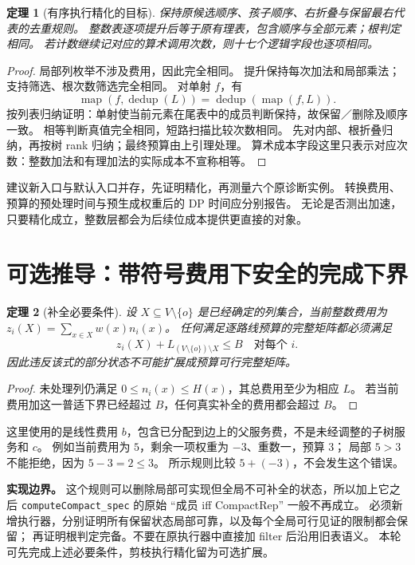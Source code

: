 \documentclass[UTF8,a4paper,11pt]{ctexart}
\newtheorem{theorem}{定理}[section]
\theoremstyle{definition}
\begin{document}
\begin{theorem}[有序执行精化的目标]
保持原候选顺序、孩子顺序、右折叠与保留最右代表的去重规则。
整数表逐项提升后等于原有理表，包含顺序与全部元素；根判定相同。
若计数继续记对应的算术调用次数，则十七个逻辑字段也逐项相同。
\end{theorem}
\begin{proof}
局部列枚举不涉及费用，因此完全相同。
提升保持每次加法和局部乘法；支持筛选、根次数筛选完全相同。
对单射 $f$，有
\[
 \operatorname{map}(f,\operatorname{dedup}(L))
 =\operatorname{dedup}(\operatorname{map}(f,L)).
\]
按列表归纳证明：单射使当前元素在尾表中的成员判断保持，故保留／删除及顺序一致。
相等判断真值完全相同，短路扫描比较次数相同。
先对内部、根折叠归纳，再按树 rank 归纳；最终预算由上引理处理。
算术成本字段这里只表示对应次数：整数加法和有理加法的实际成本不宣称相等。
\end{proof}

建议新入口与默认入口并存，先证明精化，再测量六个原诊断实例。
转换费用、预算的预处理时间与预生成权重后的 DP 时间应分别报告。
无论是否测出加速，只要精化成立，整数层都会为后续位成本提供更直接的对象。

\section{可选推导：带符号费用下安全的完成下界}

\begin{theorem}[补全必要条件]
设 $X\subseteq V\setminus\{o\}$ 是已经确定的列集合，当前整数费用为
$z_i(X)=\sum_{x\in X}w(x)n_i(x)$。
任何满足逐路线预算的完整矩阵都必须满足
\[
 z_i(X)+L_{(V\setminus\{o\})\setminus X}\le B\quad\text{对每个 }i.
\]
因此违反该式的部分状态不可能扩展成预算可行完整矩阵。
\end{theorem}
\begin{proof}
未处理列仍满足 $0\le n_i(x)\le H(x)$，其总费用至少为相应 $L$。
若当前费用加这一普适下界已经超过 $B$，任何真实补全的费用都会超过 $B$。
\end{proof}
这里使用的是线性费用 $b$，包含已分配到边上的父服务费，不是未经调整的子树服务和 $c$。
例如当前费用为 $5$，剩余一项权重为 $-3$、重数一，预算 $3$；
局部 $5>3$ 不能拒绝，因为 $5-3=2\le3$。
所示规则比较 $5+(-3)$，不会发生这个错误。

\textbf{实现边界。}
这个规则可以删除局部可实现但全局不可补全的状态，所以加上它之后
\texttt{computeCompact\_spec} 的原始 ``成员 iff CompactRep'' 一般不再成立。
必须新增执行器，分别证明所有保留状态局部可靠，以及每个全局可行见证的限制都会保留；
再证明根判定完备。不要在原执行器中直接加 filter 后沿用旧表语义。
本轮可先完成上述必要条件，剪枝执行精化留为可选扩展。
\end{document}
